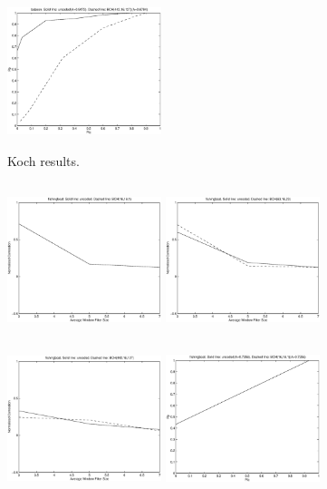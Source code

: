 \documentclass[12pt]{article}
\begin{document}
\begin{figure}[p]
        \includegraphics[height=4.5cm,width=4.5cm]{plot10.eps}
        \caption{Koch results.}
\end{figure}
\begin{figure}[p]
        \includegraphics[height=4.5cm,width=4.5cm]{plot11.eps}
        \includegraphics[height=4.5cm,width=4.5cm]{plot15.eps}
        \includegraphics[height=4.5cm,width=4.5cm]{plot19.eps}
        \includegraphics[height=4.5cm,width=4.5cm]{plot12.eps}

\end{figure}
\end{document}
